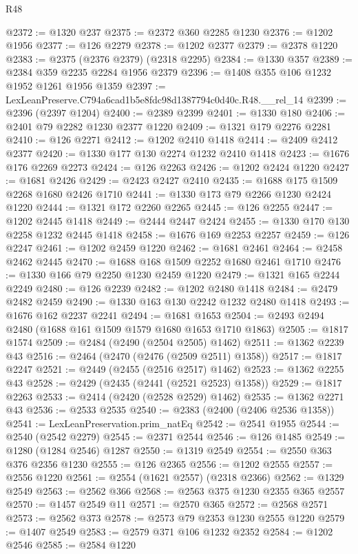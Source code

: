 \begin{lexlean}{R48}
\begin{coremodule}
@2372 := @1320 @237
@2375 := @2372 @360 @2285 @1230
@2376 := @1202 @1956
@2377 := @126 @2279
@2378 := @1202 @2377
@2379 := @2378 @1220
@2383 := @2375 (@2376 @2379) (@2318 @2295)
@2384 := @1330 @357
@2389 := @2384 @359 @2235 @2284 @1956 @2379
@2396 := @1408 @355 @106 @1232 @1952 @1261 @1956 @1359
@2397 := LexLeanPreserve.C794a6cad1b5e8fdc98d1387794c0d40c.R48.__rel_14
@2399 := @2396 (@2397 @1204)
@2400 := @2389 @2399
@2401 := @1330 @180
@2406 := @2401 @79 @2282 @1230 @2377 @1220
@2409 := @1321 @179 @2276 @2281
@2410 := @126 @2271
@2412 := @1202 @2410 @1418
@2414 := @2409 @2412 @2377
@2420 := @1330 @177 @130 @2274 @1232 @2410 @1418
@2423 := @1676 @176 @2269 @2273
@2424 := @126 @2263
@2426 := @1202 @2424 @1220
@2427 := @1681 @2426
@2429 := @2423 @2427 @2410
@2435 := @1688 @175 @1509 @2268 @1680 @2426 @1710
@2441 := @1330 @173 @79 @2266 @1230 @2424 @1220
@2444 := @1321 @172 @2260 @2265
@2445 := @126 @2255
@2447 := @1202 @2445 @1418
@2449 := @2444 @2447 @2424
@2455 := @1330 @170 @130 @2258 @1232 @2445 @1418
@2458 := @1676 @169 @2253 @2257
@2459 := @126 @2247
@2461 := @1202 @2459 @1220
@2462 := @1681 @2461
@2464 := @2458 @2462 @2445
@2470 := @1688 @168 @1509 @2252 @1680 @2461 @1710
@2476 := @1330 @166 @79 @2250 @1230 @2459 @1220
@2479 := @1321 @165 @2244 @2249
@2480 := @126 @2239
@2482 := @1202 @2480 @1418
@2484 := @2479 @2482 @2459
@2490 := @1330 @163 @130 @2242 @1232 @2480 @1418
@2493 := @1676 @162 @2237 @2241
@2494 := @1681 @1653
@2504 := @2493 @2494 @2480 (@1688 @161 @1509 @1579 @1680 @1653 @1710 @1863)
@2505 := @1817 @1574
@2509 := @2484 (@2490 (@2504 @2505) @1462)
@2511 := @1362 @2239 @43
@2516 := @2464 (@2470 (@2476 (@2509 @2511) @1358))
@2517 := @1817 @2247
@2521 := @2449 (@2455 (@2516 @2517) @1462)
@2523 := @1362 @2255 @43
@2528 := @2429 (@2435 (@2441 (@2521 @2523) @1358))
@2529 := @1817 @2263
@2533 := @2414 (@2420 (@2528 @2529) @1462)
@2535 := @1362 @2271 @43
@2536 := @2533 @2535
@2540 := @2383 (@2400 (@2406 @2536 @1358))
@2541 := LexLeanPreservation.prim_natEq
@2542 := @2541 @1955
@2544 := @2540 (@2542 @2279)
@2545 := @2371 @2544
@2546 := @126 @1485
@2549 := @1280 (@1284 @2546) @1287
@2550 := @1319 @2549
@2554 := @2550 @363 @376 @2356 @1230
@2555 := @126 @2365
@2556 := @1202 @2555
@2557 := @2556 @1220
@2561 := @2554 (@1621 @2557) (@2318 @2366)
@2562 := @1329 @2549
@2563 := @2562 @366
@2568 := @2563 @375 @1230 @2355 @365 @2557
@2570 := @1457 @2549 @11
@2571 := @2570 @365
@2572 := @2568 @2571
@2573 := @2562 @373
@2578 := @2573 @79 @2353 @1230 @2555 @1220
@2579 := @1407 @2549
@2583 := @2579 @371 @106 @1232 @2352
@2584 := @1202 @2546
@2585 := @2584 @1220

\end{coremodule}
\end{lexlean}
